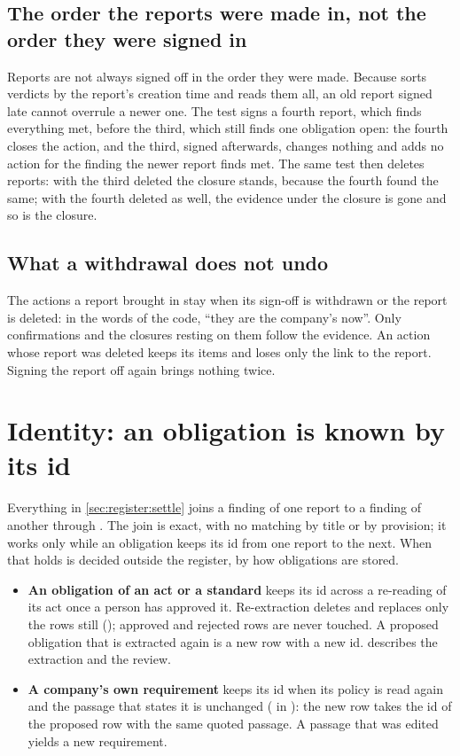 \subsection{The order the reports were made in, not the order they were signed in}

Reports are not always signed off in the order they were made. Because  sorts
verdicts by the report's creation time and reads them all, an old report signed late cannot
overrule a newer one. The test 
signs a fourth report, which finds everything met, before the third, which still finds one
obligation open: the fourth closes the action, and the third, signed afterwards, changes
nothing and adds no action for the finding the newer report finds met. The same test then
deletes reports: with the third deleted the closure stands, because the fourth found the
same; with the fourth deleted as well, the evidence under the closure is gone and so is the
closure.

\subsection{What a withdrawal does not undo}

The actions a report brought in stay when its sign-off is withdrawn or the report is deleted:
in the words of the code, \enquote{they are the company's now}. Only confirmations and the
closures resting on them follow the evidence. An action whose report was deleted keeps its
items and loses only the link to the report. Signing the report off again brings nothing
twice.


\section{Identity: an obligation is known by its id}\label{sec:register:identity}

Everything in \cref{sec:register:settle} joins a finding of one report to a finding of
another through . The join is exact, with no matching by title or by
provision; it works only while an obligation keeps its id from one report to the next. When
that holds is decided outside the register, by how obligations are stored.

\begin{itemize}
  \item \textbf{An obligation of an act or a standard} keeps its id across a re-reading of its
    act once a person has approved it. Re-extraction deletes and replaces only the rows still
     (); approved and rejected rows are never
    touched. A proposed obligation that is extracted again is a new row with a new id.
     describes the extraction and the review.
  \item \textbf{A company's own requirement} keeps its id when its policy is read again and
    the passage that states it is unchanged ( in
    ): the new row takes the id of the proposed row with the same
    quoted passage. A passage that was edited yields a new requirement.
\end{itemize}

